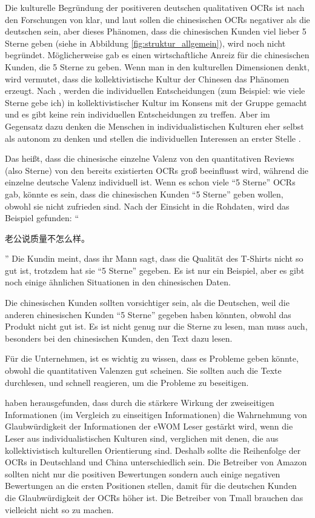 Die kulturelle Begründung der positiveren deutschen qualitativen \ac{OCRs} ist nach den Forschungen von \citet{donthu1998cultural} klar, und laut \citet{liu2001relationships} sollen die chinesischen \ac{OCRs} negativer als die deutschen sein, aber dieses Phänomen, dass die chinesischen Kunden viel lieber 5 Sterne geben (siehe in Abbildung \ref{fig:struktur_allgemein}), wird noch nicht begründet. Möglicherweise gab es einen wirtschaftliche Anreiz für die chinesischen Kunden, die 5 Sterne zu geben. Wenn man in den kulturellen Dimensionen denkt, wird vermutet, dass die kollektivistische Kultur der Chinesen das Phänomen erzeugt. Nach \citet[p. ~65]{hofstede1998masculinity}, werden die individuellen Entscheidungen (zum Beispiel: wie viele Sterne gebe ich) in kollektivistischer Kultur im Konsens mit der Gruppe gemacht und es gibt keine rein individuellen Entscheidungen zu treffen. Aber im Gegensatz dazu denken die Menschen in individualistischen Kulturen eher selbst als autonom zu denken und stellen die individuellen Interessen an erster Stelle \citep{shweder1990defense}. 

Das heißt, dass die chinesische einzelne Valenz von den quantitativen Reviews (also Sterne) von den bereits existierten \ac{OCRs} groß beeinflusst wird, während die einzelne deutsche Valenz individuell ist. Wenn es schon viele ``5 Sterne'' \ac{OCRs} gab, könnte es sein, dass die chinesischen Kunden ``5 Sterne'' geben wollen, obwohl sie nicht zufrieden sind. Nach der Einsicht in die Rohdaten, wird das Beispiel gefunden: ``
\begin{CJK*}{UTF8}{gbsn}
	老公说质量不怎么样。
\end{CJK*}
'' Die Kundin meint, dass ihr Mann sagt, dass die Qualität des T-Shirts nicht so gut ist, trotzdem hat sie ``5 Sterne'' gegeben. Es ist nur ein Beispiel, aber es gibt noch einige ähnlichen Situationen in den chinesischen Daten.

Die chinesischen Kunden sollten vorsichtiger sein, als die Deutschen, weil die anderen chinesischen Kunden ``5 Sterne'' gegeben haben könnten, obwohl das Produkt nicht gut ist. Es ist nicht genug nur die Sterne zu lesen, man muss auch, besonders bei den chinesischen Kunden, den Text dazu lesen.

Für die Unternehmen, ist es wichtig zu wissen, dass es Probleme geben könnte, obwohl die quantitativen Valenzen gut scheinen. Sie sollten auch die Texte durchlesen, und schnell reagieren, um die Probleme zu beseitigen. 

\citet{Luo2014} haben herausgefunden, dass durch die stärkere Wirkung der zweiseitigen Informationen (im Vergleich zu einseitigen Informationen) die Wahrnehmung von Glaubwürdigkeit der Informationen der \ac{eWOM} Leser gestärkt wird, wenn die Leser aus individualistischen Kulturen sind, verglichen mit denen, die aus kollektivistisch kulturellen Orientierung sind. Deshalb sollte die Reihenfolge der \ac{OCRs} in Deutschland und China unterschiedlich sein. Die Betreiber von Amazon sollten nicht nur die positiven Bewertungen sondern auch einige negativen Bewertungen an die ersten Positionen stellen, damit für die deutschen Kunden die Glaubwürdigkeit der \ac{OCRs} höher ist. Die Betreiber von Tmall brauchen das vielleicht nicht so zu machen.

